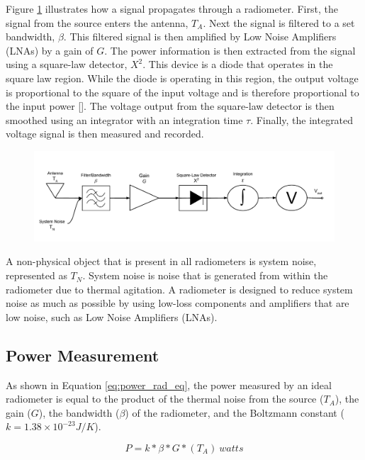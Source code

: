 Figure \ref{trad_radiometer} illustrates how a signal propagates through a radiometer.  First, the signal from the source enters the antenna, $T_A$.  Next the signal is filtered to a set bandwidth, $\beta$.  This filtered signal is then amplified by Low Noise Amplifiers (LNAs) by a gain of $G$.  The power information is then extracted from the signal using a square-law detector, $X^2$.  This device is a diode that operates in the square law region.  While the diode is operating in this region, the output voltage is proportional to the square of the input voltage and is therefore proportional to the input power [\cite{Leinweber}].  The voltage output from the square-law detector is then smoothed using an integrator with an integration time $\tau$.  Finally, the integrated voltage signal is then measured and recorded.

{\begin{figure}[h!tb] 
\centering
\includegraphics[width=\textwidth]{Images/Traditional_Radiometer.pdf}
\label{trad_radiometer}
\end{figure}
}

A non-physical object that is present in all radiometers is system noise, represented as $T_{N}$.  System noise is noise that is generated from within the radiometer due to thermal agitation.  A radiometer is designed to reduce system noise as much as possible by using low-loss components and amplifiers that are low noise, such as Low Noise Amplifiers (LNAs). 

\subsection{Power Measurement}\label{pwr_measurement}

As shown in Equation \ref{eq:power_rad_eq}, the power measured by an ideal radiometer is equal to the product of the thermal noise from the source ($T_A$), the gain ($G$), the bandwidth ($\beta$) of the radiometer, and the Boltzmann constant ($k=1.38 \times 10^{-23} J/K$).

\begin{equation} \label{eq:power_rad_eq}
P=k*\beta*G*(T_{A})\ watts
\end{equation}

